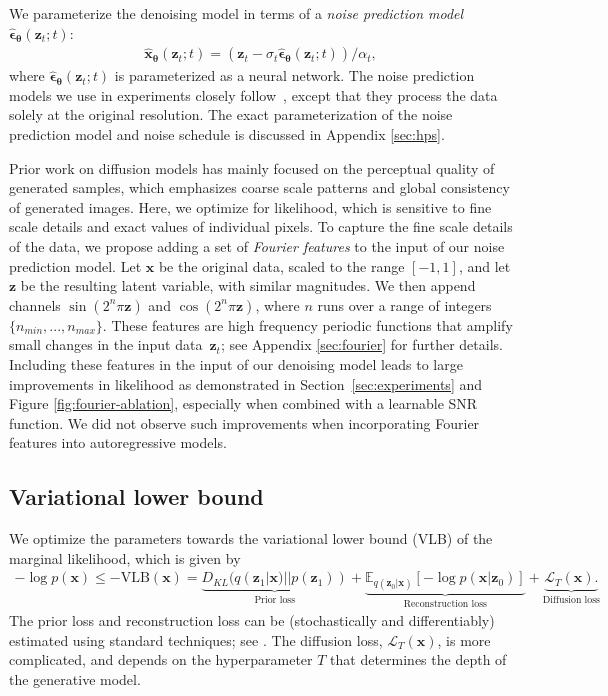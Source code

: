 \documentclass{article}
\def\rvx{{\mathbf{x}}}
\def\rvz{{\mathbf{z}}}
\newcommand{\E}{\mathbb{E}}
\newcommand{\bT}{{\boldsymbol{\theta}}}
\newcommand{\bepsilon}{{\boldsymbol{\epsilon}}}
\newcommand{\lT}{\mathcal{L}_T(\rvx)}
\begin{document}
We parameterize the denoising model in terms of a \emph{noise prediction model} $\hat{\bepsilon}_{\bT}(\rvz_t; t)$:
\begin{align}
    \hat{\rvx}_{\bT}(\rvz_t; t) = (\rvz_t - \sigma_t \hat{\bepsilon}_{\bT}(\rvz_t; t))/\alpha_t,
\label{eq:noisepred}
\end{align}
where $\hat{\bepsilon}_{\bT}(\rvz_t; t)$ is parameterized as a neural network. The noise prediction models we use in experiments closely follow~\cite{ho2020denoising}, except that they process the data solely at the original resolution. The exact parameterization of the noise prediction model and noise schedule is discussed in Appendix \ref{sec:hps}.

Prior work on diffusion models has mainly focused on the perceptual quality of generated samples, which emphasizes coarse scale patterns and global consistency of generated images. Here, we optimize for likelihood, which is sensitive to fine scale details and exact values of individual pixels.  To capture the fine scale details of the data, we propose adding a set of \emph{Fourier features} to the input of our noise prediction model. Let $\rvx$ be the original data, scaled to the range $[-1,1]$, and let $\rvz$ be the resulting latent variable, with similar magnitudes. We then append channels $\sin(2^n\pi\rvz)$ and $\cos(2^n\pi\rvz)$, where $n$ runs over a range of integers $\{n_{min}, ..., n_{max}\}$. These features are high frequency periodic functions that amplify small changes in the input data~$\rvz_t$; see Appendix \ref{sec:fourier} for further details.
Including these features in the input of our denoising model leads to large improvements in likelihood as demonstrated in Section~\ref{sec:experiments} and Figure \ref{fig:fourier-ablation}, especially when combined with a learnable SNR function. We did not observe such improvements when incorporating Fourier features into autoregressive models.

\subsection{Variational lower bound}
We optimize the parameters towards the variational lower bound (VLB) of the marginal likelihood, which is given by
\begin{align}
    - \log p(\rvx) \leq - \text{VLB}(\rvx) =
    \underbrace{D_{KL}(q(\rvz_1|\rvx)||p(\rvz_1))
}_{\text{Prior loss}}
    + \underbrace{\E_{q(\rvz_0|\rvx)}\left[ - \log p(\rvx|\rvz_0) \right]
    }_{\text{Reconstruction loss}}
    +
    \underbrace{
    \lT.
    }_{\text{Diffusion loss}}
    \label{eq:finite_elbo_1}
\end{align}
The prior loss and reconstruction loss can be (stochastically and differentiably) estimated using standard techniques; see \citep{kingma2013auto}. The diffusion loss, $\lT$, is more complicated, and depends on the hyperparameter $T$ that determines the depth of the generative model. 
\end{document}
